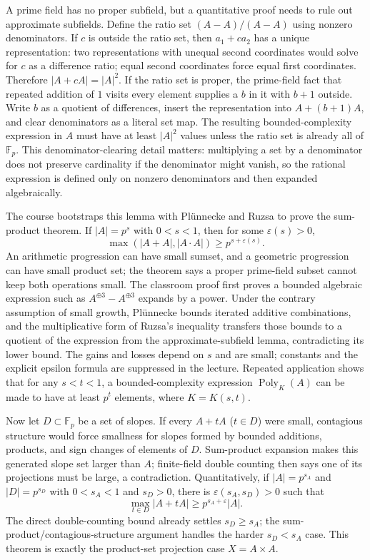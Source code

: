 A prime field has no proper subfield, but a quantitative proof needs to rule out approximate subfields. Define the ratio set \((A-A)/(A-A)\) using nonzero denominators. If \(c\) is outside the ratio set, then \(a_1+ca_2\) has a unique representation: two representations with unequal second coordinates would solve for \(c\) as a difference ratio; equal second coordinates force equal first coordinates. Therefore \(|A+cA|=|A|^2\). If the ratio set is proper, the prime-field fact that repeated addition of \(1\) visits every element supplies a \(b\) in it with \(b+1\) outside. Write \(b\) as a quotient of differences, insert the representation into \(A+(b+1)A\), and clear denominators as a literal set map. The resulting bounded-complexity expression in \(A\) must have at least \(|A|^2\) values unless the ratio set is already all of \(\mathbb F_p\). This denominator-clearing detail matters: multiplying a set by a denominator does not preserve cardinality if the denominator might vanish, so the rational expression is defined only on nonzero denominators and then expanded algebraically.

The course bootstraps this lemma with Plünnecke and Ruzsa to prove the sum-product theorem. If \(|A|=p^s\) with \(0<s<1\), then for some \(\varepsilon(s)>0\), \[
\max(|A+A|,|A\cdot A|)\ge p^{s+\varepsilon(s)}.
\] An arithmetic progression can have small sumset, and a geometric progression can have small product set; the theorem says a proper prime-field subset cannot keep both operations small. The classroom proof first proves a bounded algebraic expression such as \(A^{\oplus3}-A^{\oplus3}\) expands by a power. Under the contrary assumption of small growth, Plünnecke bounds iterated additive combinations, and the multiplicative form of Ruzsa's inequality transfers those bounds to a quotient of the expression from the approximate-subfield lemma, contradicting its lower bound. The gains and losses depend on \(s\) and are small; constants and the explicit epsilon formula are suppressed in the lecture. Repeated application shows that for any \(s<t<1\), a bounded-complexity expression \(\operatorname{Poly}_K(A)\) can be made to have at least \(p^t\) elements, where \(K=K(s,t)\).

Now let \(D\subset\mathbb F_p\) be a set of slopes. If every \(A+tA\) (\(t\in D\)) were small, contagious structure would force smallness for slopes formed by bounded additions, products, and sign changes of elements of \(D\). Sum-product expansion makes this generated slope set larger than \(A\); finite-field double counting then says one of its projections must be large, a contradiction. Quantitatively, if \(|A|=p^{s_A}\) and \(|D|=p^{s_D}\) with \(0<s_A<1\) and \(s_D>0\), there is \(\varepsilon(s_A,s_D)>0\) such that \[
\max_{t\in D}|A+tA|\ge p^{s_A+\varepsilon}|A|.
\] The direct double-counting bound already settles \(s_D\ge s_A\); the sum-product/contagious-structure argument handles the harder \(s_D<s_A\) case. This theorem is exactly the product-set projection case \(X=A\times A\).

